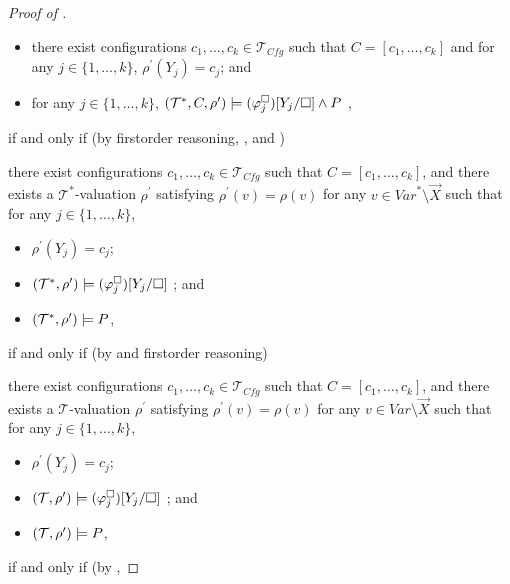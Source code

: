 \begin{proof}[Proof of ]
\begin{proofenv}
\begin{itemize}
            \item there exist configurations $c_1, \ldots, c_k \in \mathcal{T}_{\mathit{Cfg}}$ such that
                    $C = [c_1, \ldots, c_k]$ and for any $j \in \{ 1, \ldots, k \}$,
                    $\rho^{\prime}(Y_j) = c_j$; and
            \item for any $j \in \{ 1, \ldots, k \}$,
                    $(\mathcal{T}^*, C, \rho^\prime) \models (\varphi_j^{\square})[Y_j/\square] \land P$ ,
        \end{itemize}
    \end{proofenv}
    if and only if (by firstorder reasoning, , and )
    \begin{proofenv}
        there exist configurations $c_1, \ldots, c_k \in \mathcal{T}_{\mathit{Cfg}}$ such that $C = [c_1, \ldots, c_k]$,
        and there exists a $\mathcal{T}^*$-valuation $\rho^\prime$ satisfying $\rho^\prime(v) = \rho(v)$
        for any $v \in \mathit{Var}^* \setminus \vec{X}$ such that for any $j \in \{ 1, \ldots, k \}$,
        \begin{itemize}
            \item $\rho^{\prime}(Y_j) = c_j$;
            \item $(\mathcal{T}^*, \rho^\prime) \models (\varphi_j^{\square})[Y_j/\square]$ ; and
            \item $(\mathcal{T}^*, \rho^\prime) \models P$,
        \end{itemize}
    \end{proofenv}
    if and only if (by  and firstorder reasoning)
    \begin{proofenv}
        there exist configurations $c_1, \ldots, c_k \in \mathcal{T}_{\mathit{Cfg}}$ such that $C = [c_1, \ldots, c_k]$,
        and there exists a $\mathcal{T}$-valuation $\rho^\prime$ satisfying $\rho^\prime(v) = \rho(v)$
        for any $v \in \mathit{Var} \setminus \vec{X}$ such that for any $j \in \{ 1, \ldots, k \}$,
        \begin{itemize}
            \item $\rho^{\prime}(Y_j) = c_j$;
            \item $(\mathcal{T}, \rho^\prime) \models (\varphi_j^{\square})[Y_j/\square]$ ; and
            \item $(\mathcal{T}, \rho^\prime) \models P$,
        \end{itemize}
    \end{proofenv}
    if and only if (by ,

\end{proof}

